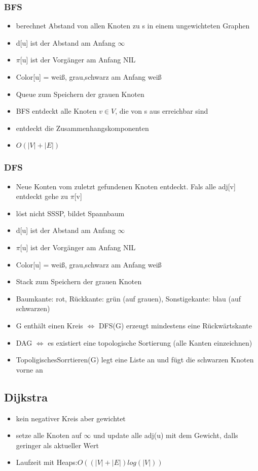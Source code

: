 \documentclass{article}
\begin{document}
\subsubsection{BFS}
\begin{itemize}
\item berechnet Abstand von allen Knoten zu s in einem ungewichteten Graphen
\item d[u] ist der Abstand am Anfang $\infty$
\item $\pi$[u] ist der Vorg{\"a}nger am Anfang NIL
\item Color[u] = wei\ss, grau,schwarz am Anfang wei\ss
\item Queue zum Speichern der grauen Knoten
\item BFS entdeckt alle Knoten $v\in V$, die von s aus erreichbar sind
\item entdeckt die Zusammenhangskomponenten
\item $O(|V|+|E|)$
\end{itemize}

\subsubsection{DFS}
\begin{itemize}
\item Neue Konten vom zuletzt gefundenen Knoten entdeckt. Fals alle adj[v] entdeckt gehe zu $\pi$[v]
\item l{\"o}st nicht SSSP, bildet Spannbaum
\item d[u] ist der Abstand am Anfang $\infty$
\item $\pi$[u] ist der Vorg{\"a}nger am Anfang NIL
\item Color[u] = wei\ss, grau,schwarz am Anfang wei\ss
\item Stack zum Speichern der grauen Knoten
\item Baumkante: rot, R{\"u}ckkante: gr{\"u}n (auf grauen), Sonstigekante: blau (auf schwarzen)
\item G enth{\"a}lt einen Kreis $\Leftrightarrow$ DFS(G) erzeugt mindestens eine R{\"u}ckw{\"a}rtskante
\item DAG $\Leftrightarrow$ es existiert eine topologische Sortierung (alle Kanten einzeichnen)
\item TopoligischesSorrtieren(G) legt eine Liste an und f{\"u}gt die schwarzen Knoten vorne an
\end{itemize}

\subsection{Dijkstra}
\begin{itemize}
\item kein negativer Kreis aber gewichtet
\item setze alle Knoten auf $\infty$ und update alle adj(u) mit dem Gewicht, dalls geringer als aktueller Wert
\item Laufzeit mit Heaps:$O((|V|+|E|)log(|V|))$
\end{itemize}
\end{document}
